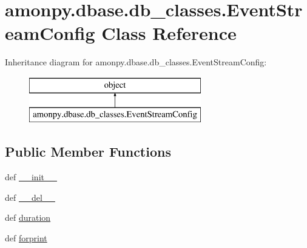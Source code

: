 \hypertarget{classamonpy_1_1dbase_1_1db__classes_1_1_event_stream_config}{\section{amonpy.\-dbase.\-db\-\_\-classes.\-Event\-Stream\-Config Class Reference}
\label{classamonpy_1_1dbase_1_1db__classes_1_1_event_stream_config}
}
Inheritance diagram for amonpy.\-dbase.\-db\-\_\-classes.\-Event\-Stream\-Config\-:\begin{figure}[H]
\begin{center}
\leavevmode
\includegraphics[height=2.000000cm]{classamonpy_1_1dbase_1_1db__classes_1_1_event_stream_config}
\end{center}
\end{figure}
\subsection*{Public Member Functions}
\begin{DoxyCompactItemize}
\item 
def \hyperlink{classamonpy_1_1dbase_1_1db__classes_1_1_event_stream_config_aeb56a654ef2b92bbeadf0bc5d43c4566}{\-\_\-\-\_\-init\-\_\-\-\_\-}
\item 
def \hyperlink{classamonpy_1_1dbase_1_1db__classes_1_1_event_stream_config_a713144a836f6d6853402597dc92eeec4}{\-\_\-\-\_\-del\-\_\-\-\_\-}
\item 
def \hyperlink{classamonpy_1_1dbase_1_1db__classes_1_1_event_stream_config_ad768b680b9b6e6b71b0b98cf5290c8fe}{duration}
\item 
def \hyperlink{classamonpy_1_1dbase_1_1db__classes_1_1_event_stream_config_a8b9de3b238c2062a10fad4b05b2290f2}{forprint}
\end{DoxyCompactItemize}
